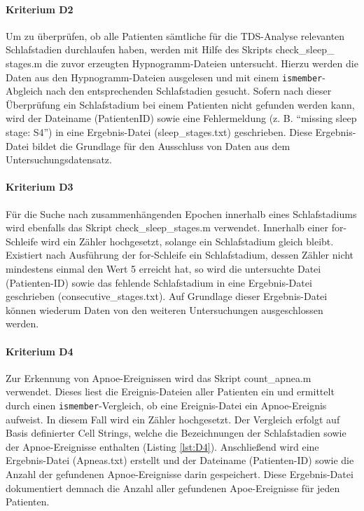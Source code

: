\paragraph{Kriterium D2} Um zu überprüfen, ob alle Patienten sämtliche für die \acs{TDS}-Analyse relevanten Schlafstadien durchlaufen haben, werden mit Hilfe des Skripts check\_sleep\_ stages.m die zuvor erzeugten Hypnogramm-Dateien untersucht. Hierzu werden die Daten aus den Hypnogramm-Dateien ausgelesen und mit einem \texttt{ismember}-Abgleich nach den entsprechenden Schlafstadien gesucht. Sofern nach dieser Überprüfung ein Schlafstadium bei einem Patienten nicht gefunden werden kann, wird der Dateiname (PatientenID) sowie eine Fehlermeldung (z. B. "`missing sleep stage: S4"') in eine Ergebnis-Datei (sleep\_stages.txt) geschrieben. Diese Ergebnis-Datei bildet die Grundlage für den Ausschluss von Daten aus dem Untersuchungsdatensatz.

\paragraph{Kriterium D3} Für die Suche nach zusammenhängenden Epochen innerhalb eines Schlafstadiums wird ebenfalls das Skript check\_sleep\_stages.m verwendet. Innerhalb einer for-Schleife wird ein Zähler hochgesetzt, solange ein Schlafstadium gleich bleibt. Existiert nach Ausführung der for-Schleife ein Schlafstadium, dessen Zähler nicht mindestens einmal den Wert 5 erreicht hat, so wird die untersuchte Datei (Patienten-ID) sowie das fehlende Schlafstadium in eine Ergebnis-Datei geschrieben (consecutive\_stages.txt). Auf Grundlage dieser Ergebnis-Datei können wiederum Daten von den weiteren Untersuchungen ausgeschlossen werden.

\paragraph{Kriterium D4} Zur Erkennung von Apnoe-Ereignissen wird das Skript count\_apnea.m verwendet. Dieses liest die Ereignis-Dateien aller Patienten ein und ermittelt durch einen \texttt{ismember}-Vergleich, ob eine Ereignis-Datei ein Apnoe-Ereignis aufweist. In diesem Fall wird ein Zähler hochgesetzt. Der Vergleich erfolgt auf Basis definierter Cell Strings, welche die Bezeichnungen der Schlafstadien sowie der Apnoe-Ereignisse enthalten (Listing \ref{lst:D4}). Anschließend wird eine Ergebnis-Datei (Apneas.txt) erstellt und der Dateiname (Patienten-ID) sowie die Anzahl der gefundenen Apnoe-Ereignisse darin gespeichert. Diese Ergebnis-Datei dokumentiert demnach die Anzahl aller gefundenen Apoe-Ereignisse für jeden Patienten.\\

